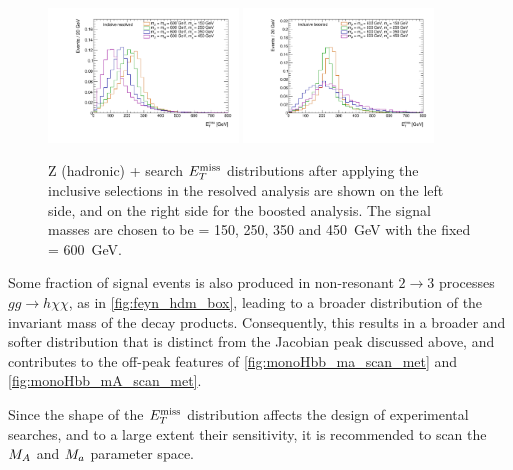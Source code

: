 \begin{figure}
\centering
\includegraphics[width=0.45\textwidth]{texinputs/04_grid/figures/monoz/hadronic/mA600_incl_resl_MET_linear.pdf}
\includegraphics[width=0.45\textwidth]{texinputs/04_grid/figures/monoz/hadronic/mA600_incl_merged_MET_linear.pdf}
\caption{Z (hadronic) + \MET search $E_T^\mathrm{miss}$ distributions 
after applying the inclusive selections in the resolved analysis are shown on the left side, and on the right side
for the boosted analysis. The signal masses are chosen to be \ma = 150, 250, 350 and 450~GeV with the fixed \mA = 600~GeV.}
\label{fig:monozhad_kin_inc_fixed_mA}
\end{figure}

Some fraction of signal events is also produced in non-resonant $2 \to 3$ processes $gg \to h \chi \chi$, as in \autoref{fig:feyn_hdm_box}, leading to a broader distribution of the invariant mass of the decay products.  
Consequently, this results in a broader and softer \met distribution that is distinct from the Jacobian peak discussed above, and contributes to the off-peak features of \autoref{fig:monoHbb_ma_scan_met} and \autoref{fig:monoHbb_mA_scan_met}. 

Since the shape of the $E_T^\mathrm{miss}$ distribution affects the design of experimental searches, and to a large extent their sensitivity, it is recommended to scan the $M_{A}$ and $M_{a}$ parameter space. 



